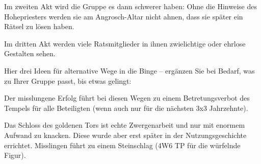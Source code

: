 \documentclass[openright]{Ilaris}
\begin{document}
Im zweiten Akt wird die Gruppe es dann schwerer haben:
Ohne die Hinweise des Hohepriesters werden sie am Angrosch-Altar nicht ahnen, dass sie später ein Rätsel zu lösen haben.

Im dritten Akt werden viele Ratsmitglieder in ihnen zwielichtige oder ehrlose Gestalten sehen.

\bigskip

Hier drei Ideen für alternative Wege in die Binge -- ergänzen Sie bei Bedarf, was zu Ihrer Gruppe passt, bis etwas gelingt:

Der misslungene Erfolg führt bei diesen Wegen zu einem Betretungsverbot des Tempels für alle Beteiligten (wenn auch nur für die nächsten 3x3 Jahrzehnte).

\bigskip

Das Schloss des goldenen Tors ist echte Zwergenarbeit und nur mit enormem Aufwand zu knacken. Diese wurde aber erst später in der Nutzungsgeschichte errichtet. 
Misslingen führt zu einem Steinschlag (4W6 TP für die würfelnde Figur).
\end{document}
